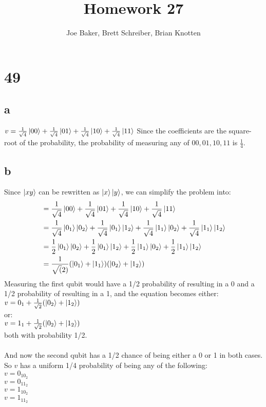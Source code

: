 \documentclass[letterpaper,notitlepage,twoside]{article}
\begin{document}
\title{Homework 27}
\author{Joe Baker, Brett Schreiber, Brian Knotten}
\maketitle

\section*{49}
\subsection*{a}
$v = \frac{1}{\sqrt{4}} \ket{00} + \frac{1}{\sqrt{4}} \ket{01} + \frac{1}{\sqrt{4}} \ket{10} + \frac{1}{\sqrt{4}} \ket{11}$
Since the coefficients are the square-root of the probability, the probability of measuring any of $00, 01, 10, 11$ is $\frac{1}{4}$.
\subsection*{b}
Since $\ket{xy}$ can be rewritten as $\ket{x}\ket{y}$, we can simplify the problem into: \\
\begin{align*}
  &= \frac{1}{\sqrt{4}} \ket{00} + \frac{1}{\sqrt{4}} \ket{01} + \frac{1}{\sqrt{4}} \ket{10} + \frac{1}{\sqrt{4}} \ket{11} \\
  &= \frac{1}{\sqrt{4}} \ket{0_1} \ket{0_2} + \frac{1}{\sqrt{4}} \ket{0_1} \ket{1_2} + \frac{1}{\sqrt{4}} \ket{1_1} \ket{0_2} + \frac{1}{\sqrt{4}} \ket{1_1}\ket{1_2} \\
  &= \frac{1}{2} \ket{0_1} \ket{0_2} + \frac{1}{2} \ket{0_1} \ket{1_2} + \frac{1}{2} \ket{1_1} \ket{0_2} + \frac{1}{2} \ket{1_1}\ket{1_2} \\
  &= \frac{1}{\sqrt(2)}(\ket{0_1} + \ket{1_1})(\ket{0_2} + \ket{1_2})
\end{align*}
Measuring the first qubit would have a 1/2 probability of resulting in a 0 and a 1/2 probability of resulting in a 1, and the equation becomes either: \\
$v = 0_1 + \frac{1}{\sqrt{2}}(\ket{0_2} + \ket{1_2})$ \\
or: \\
$v = 1_1 + \frac{1}{\sqrt{2}}(\ket{0_2} + \ket{1_2})$ \\
both with probability 1/2.\\\\

And now the second qubit has a 1/2 chance of being either a 0 or 1 in both cases. So $v$ has a uniform 1/4 probability of being any of the following:\\
$v = 0_10_2$ \\
$v = 0_11_2$ \\
$v = 1_10_2$ \\
$v = 1_11_2$ \\
\end{document}
